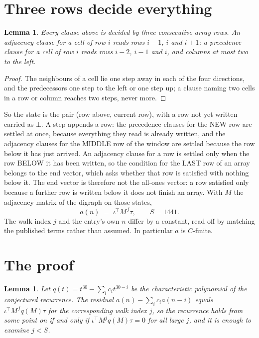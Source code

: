 \documentclass[11pt,a4paper]{article}
\theoremstyle{plain}
\newtheorem{lemma}[theorem]{Lemma}
\theoremstyle{definition}
\begin{document}
\section{Three rows decide everything}

\begin{lemma}\label{lem:win}
Every clause above is decided by three consecutive array rows. An adjacency clause for a cell
of row $i$ reads rows $i-1$, $i$ and $i+1$; a precedence clause for a cell of row $i$ reads
rows $i-2$, $i-1$ and $i$, and columns at most two to the left.
\end{lemma}

\begin{proof}
The neighbours of a cell lie one step away in each of the four directions, and the predecessors
one step to the left or one step up; a clause naming two cells in a row or column reaches two
steps, never more.
\end{proof}

So the state is the pair (row above, current row), with a row not yet written carried as
$\bot$. A step appends a row: the precedence clauses for the NEW row are settled at once,
because everything they read is already written, and the adjacency clauses for the MIDDLE row
of the window are settled because the row below it has just arrived. An adjacency clause for a row is settled only when the row BELOW it has been
written, so the condition for the LAST row of an array belongs to the end vector, which asks
whether that row is satisfied with nothing below it. The end vector is therefore not the
all-ones vector: a row satisfied only because a further row is written below it does not
finish an array. With $M$ the
adjacency matrix of the digraph on those states,
\[
a(n)\;=\;\iota^{\!\top}M^{\,j}\tau ,\qquad S=1441.
\]
The walk index $j$ and the entry's own $n$ differ by a constant, read off by matching the
published terms rather than assumed. In particular $a$ is $C$-finite.

\section{The proof}

\begin{lemma}\label{lem:crit}
Let $q(t)=t^{30}-\sum_i c_it^{30-i}$ be the characteristic polynomial of the
conjectured recurrence. The residual $a(n)-\sum_ic_ia(n-i)$ equals
$\iota^{\!\top}M^{\,j}q(M)\tau$ for the corresponding walk index $j$, so the recurrence
holds from some point on if and only if $\iota^{\!\top}M^{j}q(M)\tau=0$ for all large $j$,
and it is enough to examine $j<S$.
\end{lemma}
\end{document}
